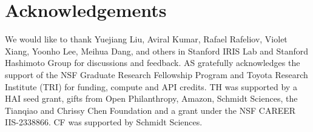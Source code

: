 \vspace{-0.2cm}
\section{Acknowledgements}
\vspace{-0.2cm}

We would like to thank Yuejiang Liu, Aviral Kumar, Rafael Rafeliov, Violet Xiang, Yoonho Lee, Meihua Dang, and others in Stanford IRIS Lab and Stanford Hashimoto Group for discussions and feedback. AS gratefully acknowledges the support of the NSF Graduate Research Fellowship Program and Toyota Research Institute (TRI) for funding, compute and API credits. TH was supported by a HAI seed grant, gifts from Open Philanthropy, Amazon, Schmidt Sciences, the Tianqiao and Chrissy Chen Foundation and a grant under the NSF CAREER IIS-2338866. CF was supported by Schmidt Sciences.